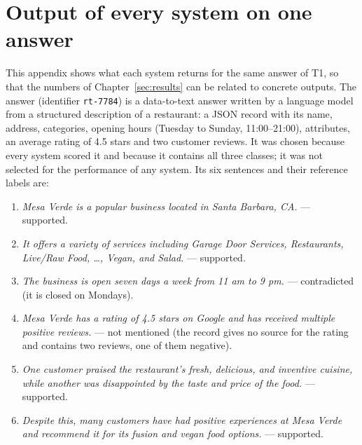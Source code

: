 \chapter{Output of every system on one answer}
\label{app:examples}


This appendix shows what each system returns for the same answer of T1, so that the numbers of
Chapter~\ref{sec:results} can be related to concrete outputs. The answer (identifier \texttt{rt-7784}) is a data-to-text
answer written by a language model from a structured description of a restaurant: a JSON record with its name, address,
categories, opening hours (Tuesday to Sunday, 11:00--21:00), attributes, an average rating of 4.5 stars and two customer
reviews. It was chosen because every system scored it and because it contains all three classes; it was not selected
for the performance of any system. Its six sentences and their reference labels are:

\begin{enumerate}
\item \emph{Mesa Verde is a popular business located in Santa Barbara, CA.} --- supported.
\item \emph{It offers a variety of services including Garage Door Services, Restaurants, Live/Raw Food, \dots, Vegan, and
Salad.} --- supported.
\item \emph{The business is open seven days a week from 11 am to 9 pm.} --- contradicted (it is closed on Mondays).
\item \emph{Mesa Verde has a rating of 4.5 stars on Google and has received multiple positive reviews.} --- not mentioned
(the record gives no source for the rating and contains two reviews, one of them negative).
\item \emph{One customer praised the restaurant's fresh, delicious, and inventive cuisine, while another was
disappointed by the taste and price of the food.} --- supported.
\item \emph{Despite this, many customers have had positive experiences at Mesa Verde and recommend it for its fusion and
vegan food options.} --- supported.
\end{enumerate}

